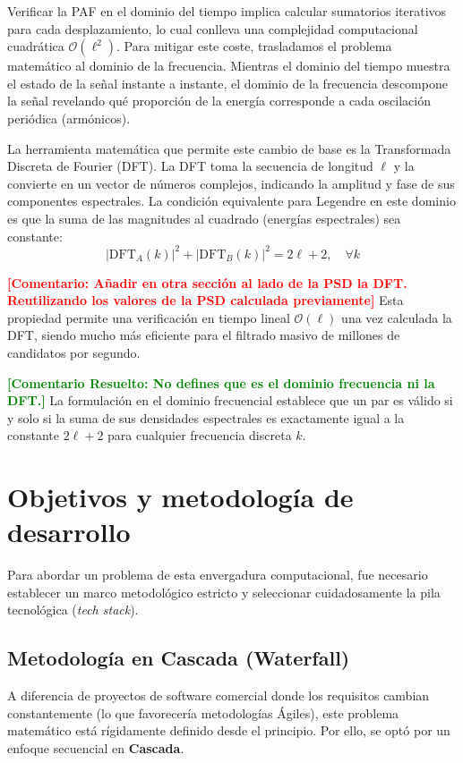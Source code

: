 \documentclass[12pt,a4paper]{tfg_domingo}
\newcommand{\Comentario}[1]{\textcolor{red}{\textbf{[Comentario:
      #1]}}}
\newcommand{\ComentarioR}[1]{\textcolor{green}{\textbf{[Comentario Resuelto:
#1]}}}
\begin{document}
Verificar la PAF en el dominio del tiempo implica calcular sumatorios iterativos para cada desplazamiento, lo cual conlleva una complejidad computacional cuadrática $\mathcal{O}(\ell^2)$. Para mitigar este coste, trasladamos el problema matemático al dominio de la frecuencia. Mientras el dominio del tiempo muestra el estado de la señal instante a instante, el dominio de la frecuencia descompone la señal revelando qué proporción de la energía corresponde a cada oscilación periódica (armónicos).

La herramienta matemática que permite este cambio de base es la Transformada Discreta de Fourier (DFT). La DFT toma la secuencia de longitud $\ell$ y la convierte en un vector de números complejos, indicando la amplitud y fase de sus componentes espectrales. La condición equivalente para Legendre en este dominio es que la suma de las magnitudes al cuadrado (energías espectrales) sea constante:
\[
|\text{DFT}_A(k)|^2 + |\text{DFT}_B(k)|^2 = 2\ell + 2, \quad \forall k
\]

\Comentario{Añadir en otra sección al lado de la PSD la DFT. Reutilizando los valores de la PSD calculada previamente}
Esta propiedad permite una verificación en tiempo lineal $\mathcal{O}(\ell)$ una vez calculada la DFT, siendo mucho más eficiente para el filtrado masivo de millones de candidatos por segundo.

\ComentarioR{No defines que es el dominio frecuencia ni la DFT.}
La formulación en el dominio frecuencial establece que un par es válido si y solo si la suma de sus densidades espectrales es exactamente igual a la constante $2\ell + 2$ para cualquier frecuencia discreta $k$.



\section{Objetivos y metodología de desarrollo}

Para abordar un problema de esta envergadura computacional, fue necesario establecer un marco metodológico estricto y seleccionar cuidadosamente la pila tecnológica (\emph{tech stack}).

\subsection{Metodología en Cascada (Waterfall)}
A diferencia de proyectos de software comercial donde los requisitos cambian constantemente (lo que favorecería metodologías Ágiles), este problema matemático está rígidamente definido desde el principio. Por ello, se optó por un enfoque secuencial en \textbf{Cascada}. 
\end{document}
